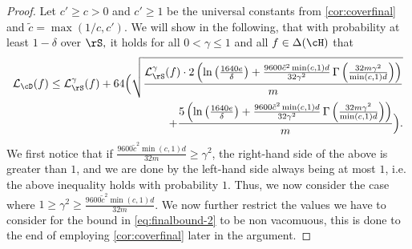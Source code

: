 \begin{proof}
    Let $ c' \geq c>0 $ and $ c'\geq 1 $  be the universal constants from \cref{cor:coverfinal} and $ \tilde{c}=\max(1/c,c').$ We will show in the following, that with probability at least $ 1-\delta $ over $ \rS,$ it holds for all $ 0<\gamma\leq 1 $ and all $ f\in \dlh $ that
    \begin{align}\label{eq:finalbound-2}
        \ls_{\cD}(f)
        \leq
        \ls_{\rS}^{\gamma}(f)
        + \cc\Big(\sqrt{\frac{\ls_{\rS}^{\gamma}(f)\cdot 2 \left(\ln{\left(\frac{1640e}{\delta} \right)}+\frac{9600\tilde{c}^2 \min(c,1)d}{32\gamma^{2}} \func{\left(  \frac{32 m\gamma^{2} }{\min(c,1)d} \right)} \right)}{m}}
        \\
        +\frac{5\left(\ln{\left(\frac{1640e}{\delta} \right)}+\frac{9600\tilde{c}^2 \min(c,1)d}{32\gamma^{2}} \func{\left(  \frac{32 m\gamma^{2} }{\min(c,1)d} \right)}\right)}{m}\Big).\nonumber
    \end{align}
    We first notice that if $\frac{9600\tilde{c}^2 \min(c,1)d}{32m}\geq \gamma^{2}$, the right-hand side of the above is greater than
    $ 1 $, and we are done by the left-hand side always being at most
    $ 1 $, i.e. the above inequality holds with probability $ 1 $.
    Thus, we now consider the case where $1\geq \gamma^{2}\geq \frac{9600\tilde{c}^2 \min(c,1)d}{32m} $. We now further restrict the values we have to consider for the bound in \cref{eq:finalbound-2} to be non vacomuous, this is done to the end of employing \cref{cor:coverfinal} later in the argument.
 

\end{proof}
